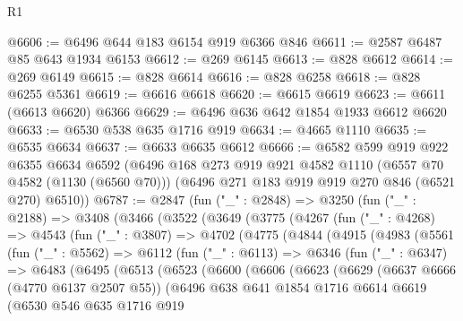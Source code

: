 \begin{lexlean}{R1}
\begin{coremodule}
@6606 := @6496 @644 @183 @6154 @919 @6366 @846
@6611 := @2587 @6487 @85 @643 @1934 @6153
@6612 := @269 @6145
@6613 := @828 @6612
@6614 := @269 @6149
@6615 := @828 @6614
@6616 := @828 @6258
@6618 := @828 @6255 @5361
@6619 := @6616 @6618
@6620 := @6615 @6619
@6623 := @6611 (@6613 @6620) @6366
@6629 := @6496 @636 @642 @1854 @1933 @6612 @6620
@6633 := @6530 @538 @635 @1716 @919
@6634 := @4665 @1110
@6635 := @6535 @6634
@6637 := @6633 @6635 @6612
@6666 := @6582
    @599
    @919
    @922
    @6355
    @6634
    @6592
    (@6496
      @168
      @273
      @919
      @921
      @4582
      @1110
      (@6557 @70 @4582 (@1130 (@6560 @70)))
      (@6496 @271 @183 @919 @919 @270 @846 (@6521 @270) @6510))
@6787 := @2847
    (fun ("_" : @2848) =>
    @3250
      (fun ("_" : @2188) =>
      @3408
        (@3466
          (@3522
            (@3649
              (@3775
                (@4267
                  (fun ("_" : @4268) =>
                  @4543
                    (fun ("_" : @3807) =>
                    @4702
                      (@4775
                        (@4844
                          (@4915
                            (@4983
                              (@5561
                                (fun ("_" : @5562) =>
                                @6112
                                  (fun ("_" : @6113) =>
                                  @6346
                                    (fun ("_" : @6347) =>
                                    @6483
                                      (@6495
                                        (@6513
                                          (@6523
                                            (@6600
                                              (@6606
                                                (@6623
                                                  (@6629
                                                    (@6637 @6666 (@4770 @6137 @2507 @55))
                                                    (@6496
                                                      @638
                                                      @641
                                                      @1854
                                                      @1716
                                                      @6614
                                                      @6619
                                                      (@6530
                                                        @546
                                                        @635
                                                        @1716
                                                        @919

\end{coremodule}
\end{lexlean}
